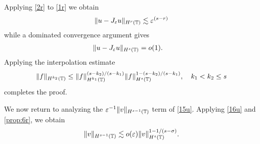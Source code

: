 %
%
Applying \eqref{2r} to \eqref{1r} we obtain
%
%
\begin{equation*}
\label{2pr}
\begin{split}
\|u - J_\varepsilon u\|_{H^r(\mathbb{T})}
\lesssim \varepsilon^{(s-r)}
\end{split}
\end{equation*}
%
%
%
%
while a dominated convergence argument gives
%
%
\begin{equation*}
\label{o1}
\begin{split}
\|u - J_\varepsilon u \|_{H^s(\mathbb{T}) } & = o(1).
\end{split}
\end{equation*}
%
%
%
%
Applying the interpolation estimate 
%
%
\begin{equation}
\begin{split}
\|f\|_{H^{k_2}(\mathbb{T})} \le
\|f\|_{H^{k_1}(\mathbb{T})}^{(s-k_2)/(s -k_1 )}
\|f\|_{H^s(\mathbb{T})}^{1 - (s-k_2)/(s -k_1 )}, \quad k_1 < k_2 \le s
\label{16u}
\end{split}
\end{equation}
%
%
%
%
%
%
completes the proof. \qquad \qedsymbol 
%

We now return to analyzing the $\varepsilon^{-1}
\|v\|_{H^{s-1}(\mathbb{T})} $ term of \eqref{15u}.
Applying \eqref{16u} and \cref{prop:6r}, 
we obtain
%
%
%
%
$$
\|v\|_{H^{s-1}(\mathbb{T})}  \lesssim o(\varepsilon) 
\|v\|_{H^s(\mathbb{T})}^{1-
1/(s- \sigma)}.
$$

